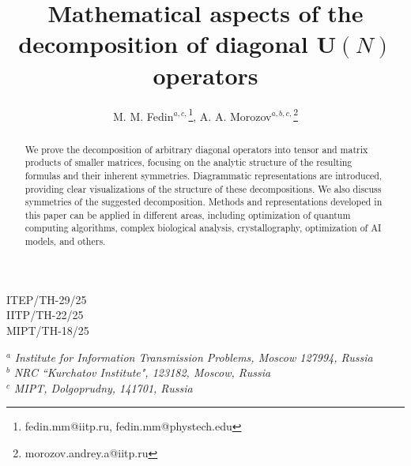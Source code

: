 \documentclass[a4paper, openany, 12pt]{article}
\theoremstyle{remark}
\theoremstyle{definition}
\begin{document}
\title{\vspace{-0.0cm}\bf
Mathematical aspects of the decomposition of diagonal $\mathbf{U}(N)$ operators}


\author{
M. M. Fedin$^{a,c,}$\footnote{fedin.mm@iitp.ru, fedin.mm@phystech.edu},
A. A. Morozov$^{a,b,c,}$\footnote{morozov.andrey.a@iitp.ru}
}

\date{ }


\maketitle

\vspace{-7.5cm}

\begin{flushleft}
    ITEP/TH-29/25\\
    IITP/TH-22/25\\
    MIPT/TH-18/25
\end{flushleft}

\vspace{3.5cm}

\begin{center}
$^a$ {\small {\it Institute for Information Transmission Problems, Moscow 127994, Russia}}\\
$^b$ {\small {\it NRC ``Kurchatov Institute", 123182, Moscow, Russia}}\\
$^c$ {\small {\it MIPT, Dolgoprudny, 141701, Russia}}
\end{center}

\date{ }


\maketitle

\begin{abstract}

    \begin{center}
    
    We prove the decomposition of arbitrary diagonal operators into tensor and matrix products of smaller matrices, focusing on the analytic structure of the resulting formulas and their inherent symmetries.  Diagrammatic representations are introduced, providing clear visualizations of the structure of these decompositions. We also discuss symmetries of the suggested decomposition. Methods and representations developed in this paper can be applied in different areas, including optimization of quantum computing algorithms, complex biological analysis, crystallography, optimization of AI models, and others.
    \end{center}

\end{abstract}
\end{document}
